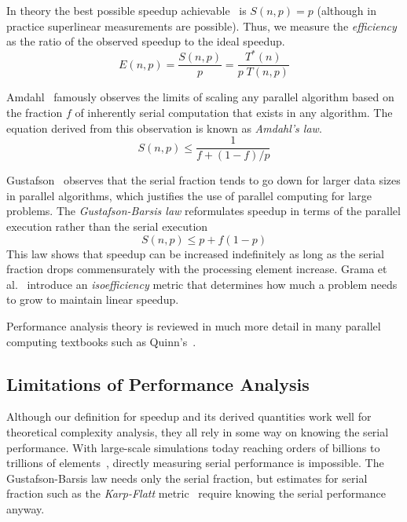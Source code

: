 \documentclass[conference]{IEEEtran}
\newcommand*{\lcite}[1]{~\cite{#1}}
\newcommand*{\scite}[1]{~\cite{#1}}
\newcommand{\etal}{et al.\xspace}
\newcommand*{\keyterm}[1]{\emph{#1}}
\begin{document}
In theory the best possible speedup achievable\lcite{Faber1986} is $S(n,p)
= p$ (although in practice superlinear measurements are possible). Thus, we
measure the \keyterm{efficiency} as the ratio of the observed speedup to
the ideal speedup.
\begin{equation}
  E(n,p) = \frac{S(n,p)}{p} = \frac{T^*(n)}{p \; T(n,p)}
  \label{eq:Efficiency}
\end{equation}

Amdahl\scite{Amdahl1967} famously observes the limits of scaling any
parallel algorithm based on the fraction $f$ of inherently serial
computation that exists in any algorithm. The equation derived from this
observation is known as \keyterm{Amdahl's law}.
\begin{equation}
  S(n,p) \leq \frac{1}{f + (1-f)/p}
  \label{eq:Amdahl}
\end{equation}

Gustafson\scite{Gustafson1988} observes that the serial fraction tends to
go down for larger data sizes in parallel algorithms, which justifies the
use of parallel computing for large problems. The \keyterm{Gustafson-Barsis
  law} reformulates speedup in terms of the parallel execution rather than
the serial execution
\begin{equation}
  S(n,p) \leq p + f(1-p)
  \label{eq:GustafsonBarsis}
\end{equation}
This law shows that speedup can be increased indefinitely as
long as the serial fraction drops commensurately with the processing
element increase. Grama \etal\scite{Grama1993} introduce an
\keyterm{isoefficiency} metric that determines how much a problem needs to
grow to maintain linear speedup.

Performance analysis theory is reviewed in much more detail in many
parallel computing textbooks such as Quinn's\scite{Quinn2004}.

\subsection{Limitations of Performance Analysis}

\noindent
Although our definition for speedup and its derived quantities work well
for theoretical complexity analysis, they all rely in some way on knowing
the serial performance. With large-scale simulations today reaching orders
of billions to trillions of
elements\lcite{Bernaschi2013,Rossinelli2013,Bussmann2013,Habib2013},
directly measuring serial performance is impossible. The Gustafson-Barsis
law needs only the serial fraction, but estimates for serial
fraction such as the \keyterm{Karp-Flatt} metric\lcite{Karp1990} require
knowing the serial performance anyway.
\end{document}
